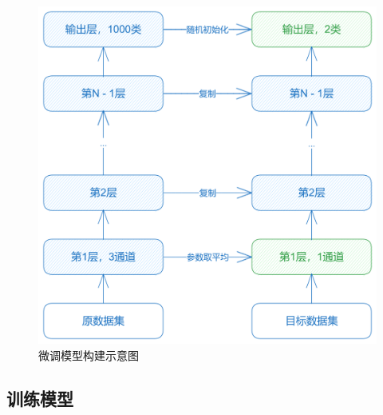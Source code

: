 \documentclass[12pt,a4paper]{article}%
\begin{document}
\begin{figure}[H]%
    \centering
    \begin{minipage}{0.65\textwidth}%
        \centering
        \includegraphics[width=1.0%
            \textwidth]{fine-tune.png}%
        \caption{\fontsize{10pt}{15pt}\selectfont 微调模型构建示意图}%
    \end{minipage}
\end{figure}

\subsection{训练模型}



\newpage



\end{document}
